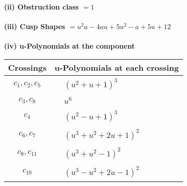 \documentclass[1p]{elsarticle_modified}
\theoremstyle{definition}
\begin{document}
\flushleft \textbf{(ii) Obstruction class $= 1$}\\~\\
\flushleft \textbf{(iii) Cusp Shapes $= u^2 a-4 a u+5 u^2- a+5 u+12$}\\~\\
\newpage\renewcommand{\arraystretch}{1}
\flushleft \textbf{(iv) u-Polynomials at the component}\newline \\
\begin{tabular}{m{50pt}|m{274pt}}
Crossings & \hspace{64pt}u-Polynomials at each crossing \\
\hline $$\begin{aligned}c_{1},c_{2},c_{5}\end{aligned}$$&$\begin{aligned}
&(u^2+u+1)^3
\end{aligned}$\\
\hline $$\begin{aligned}c_{3},c_{8}\end{aligned}$$&$\begin{aligned}
&u^6
\end{aligned}$\\
\hline $$\begin{aligned}c_{4}\end{aligned}$$&$\begin{aligned}
&(u^2- u+1)^3
\end{aligned}$\\
\hline $$\begin{aligned}c_{6},c_{7}\end{aligned}$$&$\begin{aligned}
&(u^3+u^2+2 u+1)^2
\end{aligned}$\\
\hline $$\begin{aligned}c_{9},c_{11}\end{aligned}$$&$\begin{aligned}
&(u^3+u^2-1)^2
\end{aligned}$\\
\hline $$\begin{aligned}c_{10}\end{aligned}$$&$\begin{aligned}
&(u^3- u^2+2 u-1)^2
\end{aligned}$\\
\hline
\end{tabular}\\~\\
\end{document}

